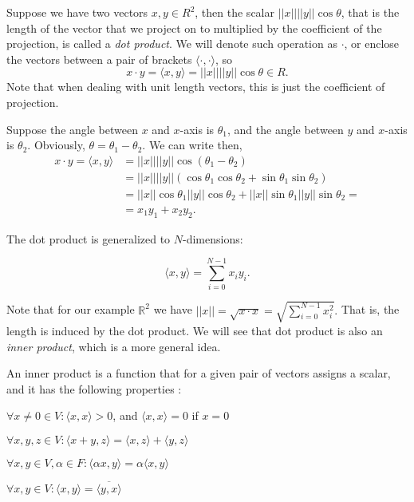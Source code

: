 \documentclass[10pt]{article}
\begin{document}
Suppose we have two vectors $x, y \in R^2$, then the scalar
$||x||||y||\cos\theta$, that is the length of the vector that we project on to
multiplied by the coefficient of the projection, is called a {\it dot product}.
We will denote such operation as $\cdot$, or enclose the vectors between a pair
of brackets $\langle \cdot, \cdot \rangle$, so $$x\cdot y=\langle x, y \rangle=
||x||||y||\cos\theta\in R.$$ Note that when dealing with unit length vectors,
this is just the coefficient of projection.

Suppose the angle between $x$ and $x$-axis is $\theta_1$, and the angle between
$y$ and $x$-axis is $\theta_2$. Obviously, $\theta=\theta_1-\theta_2$. We can
write then,
\begin{align*}
x\cdot y = \langle x, y \rangle &= ||x||||y||\cos(\theta_1-\theta_2) \\
              &= ||x||||y||(\cos\theta_1 \cos\theta_2 + \sin\theta_1 \sin\theta_2) \\
              &= ||x||\cos\theta_1 ||y||\cos\theta_2 + ||x||\sin\theta_1 ||y||\sin\theta_2 = \\
              &= x_1y_1 + x_2y_2.
\end{align*}

The dot product is generalized to $N$-dimensions:

$$ \langle x, y \rangle = \sum_{i=0}^{N-1}x_iy_i.$$

Note that for our example $\mathbb{R}^2$ we have $||x||=\sqrt{x \cdot x} =
\sqrt{\sum_{i=0}^{N-1}x_i^2}.$ That is, the length is induced by the dot
product. We will see that dot product is also an {\it inner product}, which is
a more general idea.

An inner product is a function that for a given pair of vectors assigns a
scalar, and it has the following properties \cite{Axler1997}:

\begin{description} \itemsep1pt \parskip0pt
   \item[Positivity] $\forall x \ne 0 \in V: \langle x, x \rangle > 0$, and $\langle x, x \rangle = 0$ if $x = 0$
   \item[Additivity] $\forall x, y, z \in V: \langle x + y, z \rangle = \langle x, z \rangle + \langle y, z \rangle$
   \item[Homogeneity] $\forall x, y \in V, \alpha \in F: \langle \alpha x, y \rangle = \alpha \langle x, y \rangle$
   \item[Conjugate interchange] $\forall x, y \in V: \langle x, y \rangle = \overline{\langle y, x \rangle}$
\end{description}
\end{document}
